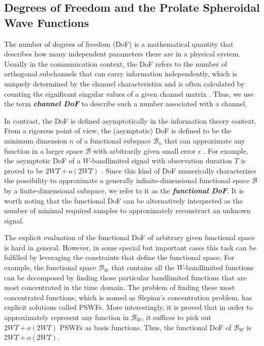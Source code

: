 \documentclass[journal,twocolumn]{IEEEtran}
\begin{document}


\subsection{Degrees of Freedom and the Prolate Spheroidal Wave Functions}
\label{Sec_2_Subsec_1}
The number of degrees of freedom (DoF) is a mathematical quantity that describes how many independent parameters there are in a physical system. 
Usually in the communication context, the DoF refers to the number of orthogonal subchannels that can carry information independently, which is uniquely determined by the channel characteristics and is often calculated by counting the significant singular values of a given channel matrix \cite{goldsmith2003capacity}. 
Thus, we use the term {\textbf{\emph{channel DoF}}} to describe such a number associated with a channel.

In contrast, the DoF is defined asymptotically in the information theory context. From a rigorous point of view, the (asymptotic) DoF is defined to be the minimum dimension $n$ of a functional subspace $\mathcal{B}_n$ that can approximate any function in a larger space $\mathcal{B}$ with arbitrarily given small error $\epsilon$ \cite{poon2005degrees}. For example, the asymptotic DoF of a $W$-bandlimited signal with observation duration $T$ is proved to be $2WT+o(2WT)$ \cite{slepian1976bandwidth}. 
Since this kind of DoF numerically characterizes the possibility to approximate a generally infinite-dimensional functional space $\mathcal{B}$ by a finite-dimensional subspace, we refer to it as the {\textbf{\emph{functional DoF}}}. 
It is worth noting that the functional DoF can be alternatively interpreted as the number of minimal required samples to approximately reconstruct an unknown signal. 

The explicit evaluation of the functional DoF of arbitrary given functional space is hard in general. However, in some special but important cases this task can be fulfilled by leveraging the constraints that define the functional space.
For example, the functional space $\mathcal{B}_W$ that contains all the $W$-bandlimited functions can be decomposed by finding those particular bandlimited functions that are most concentrated in the time domain. The problem of finding these most concentrated functions, which is named as Slepian's concentration problem, has explicit solutions called PSWFs.
More interestingly, it is proved that in order to approximately represent any function in $\mathcal{B}_W$, it suffices to pick out $2WT+o(2WT)$ PSWFs as basis functions. Thus, the functional DoF of $\mathcal{B}_W$ is $2WT+o(2WT)$. 
\end{document}
